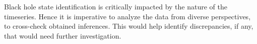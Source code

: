 \documentclass[journal]{IEEEtran}
\begin{document}
	Black hole state identification is critically impacted by the nature of the timeseries. Hence it is imperative to analyze the data from diverse perspectives, to cross-check obtained inferences. This would help identify discrepancies, if any, that would need further investigation.


%	
\end{document}
